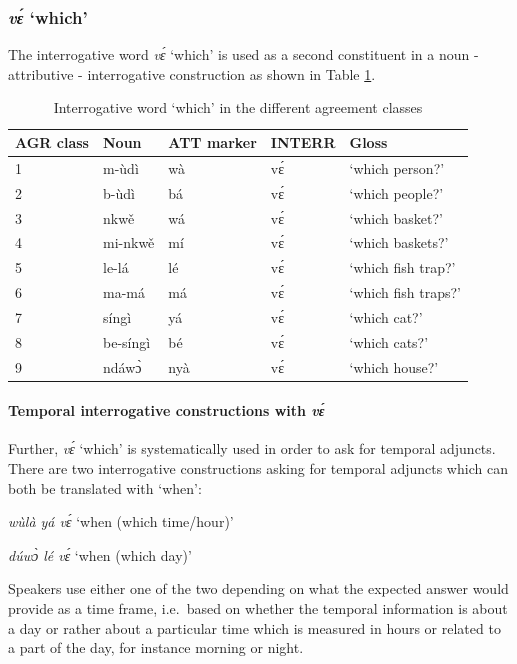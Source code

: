 \subsubsection{{\itshape vɛ́ } `which'}
\label{sec:which}

The interrogative word {\itshape vɛ́} `which' is used as a second constituent in a noun - attributive - interrogative construction as  shown in Table \ref{Tab:which}. 

\begin{table} 
\centering
\begin{tabular}{lllll}
 \midrule
AGR class & Noun &  ATT marker & INTERR & Gloss \\
  \midrule
 1 & m-ùdì  & wà  & vɛ́ & `which person?' \\
 2 & b-ùdì &  bá & vɛ́ & `which people?'  \\
 3 & nkwě &  wá & vɛ́ & `which basket?' \\
4 & mi-nkwě & mí & vɛ́ & `which baskets?' \\
5 &  le-lá & lé & vɛ́ & `which fish trap?' \\
6 & ma-má & má & vɛ́ & `which fish traps?' \\
7 & síngì & yá & vɛ́ & `which cat?' \\
8 & be-síngì &  bé & vɛ́ & `which cats?' \\
9 & ndáwɔ̀ & nyà & vɛ́ & `which house?' \\
  \midrule
\end{tabular}
\caption{Interrogative word `which' in the different agreement classes}
\label{Tab:which}
\end{table}

\paragraph{Temporal interrogative constructions with {\itshape vɛ́}} Further, {\itshape vɛ́} `which' is systematically used in order to ask for temporal adjuncts.  There are two interrogative constructions asking for temporal adjuncts which can both be translated with `when': 

{\itshape wùlà yá vɛ́} `when (which time/hour)' 

{\itshape dúwɔ̀ lé vɛ́} `when (which day)'

\noindent Speakers use either one of the two depending on what the expected answer would provide as a time frame, i.e.~based on whether the temporal information is about a day or rather about a particular time which is measured in hours or related to a part of the day, for instance morning or night. 

